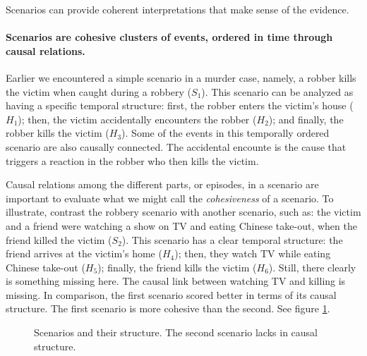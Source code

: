 \documentclass[10pt]{article}
\begin{document}

Scenarios can provide coherent interpretations that make sense of the evidence.
  
\paragraph{Scenarios are cohesive clusters 
of events, ordered in time through causal relations.} 
Earlier we encountered a simple scenario in a murder case, namely, 
a robber kills the victim when caught during a robbery ($S_1$). This scenario 
can be analyzed as having a specific 
temporal structure:
first, the robber enters the victim's house ($H_1$); then, the victim accidentally encounters the robber ($H_2$); and finally, 
the robber kills the victim ($H_3$). Some of the events in this temporally 
ordered scenario are also causally connected. %
The accidental encounte is the cause that triggers a reaction 
in the robber who then kills the victim. 

Causal relations among the different parts, or episodes, 
in a scenario are important to evaluate what we might 
call the \textit{cohesiveness} of a scenario. To illustrate, contrast the robbery scenario 
with another scenario, such as: the 
victim and a friend were watching a show on TV and eating Chinese take-out, 
when the friend killed the victim ($S_2$). 
This scenario has a clear temporal structure: the friend arrives at the victim's home ($H_4$); then, 
they watch TV while eating Chinese take-out ($H_5$); finally, the friend kills the victim ($H_6$). 
Still, there clearly is something missing here. 
The causal link between watching TV and killing is missing. 
In comparison, the first scenario scored better in terms 
of its causal structure. The first scenario 
is more cohesive than the second.  See figure \ref{fig:scens}.

\begin{figure}[bt]
\centering

\caption{Scenarios and their structure\label{fig:scens}. 
The second scenario lacks in causal structure.}
\end{figure}
\end{document}
